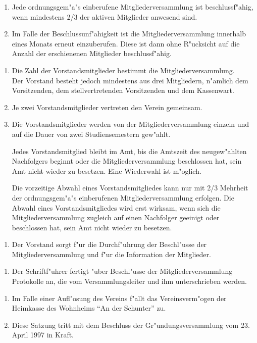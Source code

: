 \begin{enumerate}
\item Jede ordnungsgem"a"s einberufene Mitgliederversammlung ist
  beschlussf"ahig, wenn mindestens 2/3 der aktiven Mitglieder anwesend 
  sind.
\item Im Falle der Beschlussunf"ahigkeit ist die Mitgliederversammlung
  innerhalb eines Monats erneut einzuberufen. Diese ist dann ohne R"ucksicht
  auf die Anzahl der erschienenen Mitglieder beschlussf"ahig.
\end{enumerate}

\begin{enumerate}
\item Die Zahl der Vorstandsmitglieder bestimmt die Mitgliederversammlung.\\
  Der Vorstand besteht jedoch mindestens aus drei Mitgliedern, n"amlich dem 
  Vorsitzenden, dem stellvertretenden Vorsitzenden und dem Kassenwart.
\item Je zwei Vorstandsmitglieder vertreten den Verein gemeinsam.
\item Die Vorstandsmitglieder werden von der Mitgliederversammlung einzeln und
  auf die Dauer von zwei Studiensemestern gew"ahlt.
  
  Jedes Vorstandsmitglied bleibt im Amt, bis die Amtszeit des neugew"ahlten
  Nachfolgers beginnt oder die Mitgliederversammlung beschlossen hat, sein Amt
  nicht wieder zu besetzen. Eine Wiederwahl ist m"oglich.

  Die vorzeitige Abwahl eines Vorstandsmitgliedes kann nur mit 2/3 Mehrheit der
  ordnungsgem"a"s einberufenen Mitgliederversammlung erfolgen. Die
  Abwahl eines Vorstandsmitgliedes wird erst wirksam, wenn sich die 
  Mitgliederversammlung zugleich auf einen Nachfolger geeinigt oder beschlossen
  hat, sein Amt nicht wieder zu besetzen.
\end{enumerate}

\begin{enumerate}
\item[] Der Vorstand sorgt f"ur die Durchf"uhrung der Beschl"usse der
  Mitgliederversammlung und f"ur die Information der Mitglieder.
\end{enumerate}

\begin{enumerate}
\item[] Der Schriftf"uhrer fertigt "uber Beschl"usse der Mitgliederversammlung
  Protokolle an, die vom Versammlungsleiter und ihm unterschrieben werden.
\end{enumerate}

\begin{enumerate}
\item Im Falle einer Auf\/l"osung des Vereins f"allt das Vereinsverm"ogen der
  Heimkasse des Wohnheims "`An der Schunter"' zu.
\item Diese Satzung tritt mit dem Beschluss der Gr"undungsversammlung vom
  23. April 1997 in Kraft.
\end{enumerate}